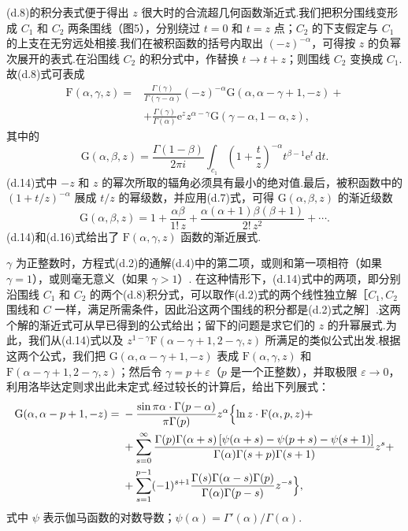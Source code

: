 (d.8)的积分表式便于得出 $z$ 很大时的合流超几何函数渐近式.我们把积分围线变形成 $C_1$ 和 $C_2$ 两条围线（图5），分别绕过 $t=0$ 和 $t=z$ 点；$C_2$ 的下支假定与 $C_1$ 的上支在无穷远处相接.我们在被积函数的括号内取出 $(-z)^{-\alpha}$，可得按 $z$ 的负幂次展开的表式.在沿围线 $C_2$ 的积分式中，作替换 $t\to t+z$；则围线 $C_2$ 变换成 $C_1$. 故(d.8)式可表成
\begin{equation}
\begin{aligned}
  \mathrm{F}(\alpha,\gamma,z)={}&\frac{\Gamma(\gamma)}{\Gamma(\gamma-\alpha)}
  (-z)^{-\alpha}\mathrm{G}(\alpha,\alpha-\gamma+1,-z)+\\
  &+\frac{\Gamma(\gamma)}{\Gamma(\alpha)}\mathrm{e}^z z^{\alpha-\gamma}
  \mathrm{G}(\gamma-\alpha,1-\alpha,z),
\end{aligned}
\end{equation}
其中的
\begin{equation}
  \mathrm{G}(\alpha,\beta,z)=\frac{\Gamma(1-\beta)}{2\pi i}\int_{c_1}
  \left(1+\frac{t}{z}\right)^{-\alpha}t^{\beta-1}\mathrm{e}^t\,\mathrm{d}t.
\end{equation}
(d.14)式中 $-z$ 和 $z$ 的幂次所取的辐角必须具有最小的绝对值.最后，被积函数中的 $\left(1+t/z\right)^{-\alpha}$ 展成 $t/z$ 的幂级数，并应用(d.7)式，可得 $\mathrm{G}(\alpha,\beta,z)$ 的渐近级数
\begin{equation}
  \mathrm{G}(\alpha,\beta,z)=1+\frac{\alpha\beta}{1!\,z}
  +\frac{\alpha(\alpha+1)\beta(\beta+1)}{2!\,z^2}+\cdots.
\end{equation}
(d.14)和(d.16)式给出了 $\mathrm{F}(\alpha,\gamma,z)$ 函数的渐近展式.

$\gamma$ 为正整数时，方程式(d.2)的通解(d.4)中的第二项，或则和第一项相符（如果 $\gamma=1$），或则毫无意义（如果 $\gamma>1$）. 在这种情形下，(d.14)式中的两项，即分别沿围线 $C_1$ 和 $C_2$ 的两个(d.8)积分式，可以取作(d.2)式的两个线性独立解［$C_1,C_2$ 围线和 $C$ 一样，满足所需条件，因此沿这两个围线的积分都是(d.2)式之解］.这两个解的渐近式可从早已得到的公式给出；留下的问题是求它们的 $z$ 的升幂展式.为此，我们从(d.14)式以及 $z^{1-\gamma}\mathrm{F}(\alpha-\gamma+1,2-\gamma,z)$ 所满足的类似公式出发.根据这两个公式，我们把 $\mathrm{G}(\alpha,\alpha-\gamma+1,-z)$ 表成 $\mathrm{F}(\alpha,\gamma,z)$ 和 $\mathrm{F}(\alpha-\gamma+1,2-\gamma,z)$；然后令 $\gamma=p+\varepsilon$（$p$ 是一个正整数），并取极限 $\varepsilon\to 0$，利用洛毕达定则求出此未定式.经过较长的计算后，给出下列展式：
\begin{equation}
\begin{aligned}
  \mathrm{G}(\alpha,\alpha-p+1,-z)={}&-\frac{\sin\pi\alpha\cdot\Gamma(p-\alpha)}{\pi\Gamma(p)}
  z^{\alpha}\Bigl\{\ln z\cdot\mathrm{F}(\alpha,p,z)+\\
  &+\sum_{s=0}^{\infty}
  \frac{\Gamma(p)\Gamma(\alpha+s)\left[\psi(\alpha+s)-\psi(p+s)-\psi(s+1)\right]}
  {\Gamma(\alpha)\Gamma(s+p)\Gamma(s+1)}z^s+\\
  &+\sum_{s=1}^{p-1}(-1)^{s+1}\frac{\Gamma(s)\Gamma(\alpha-s)\Gamma(p)}
  {\Gamma(\alpha)\Gamma(p-s)}z^{-s}\Bigr\},
\end{aligned}
\end{equation}
式中 $\psi$ 表示伽马函数的对数导数；$\psi(\alpha)=\Gamma'(\alpha)/\Gamma(\alpha)$.

